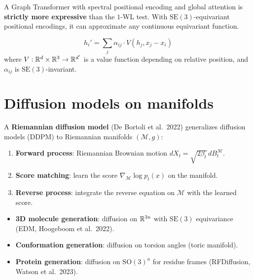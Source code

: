 \begin{theorem}
A Graph Transformer with spectral positional encoding and global
attention is \textbf{strictly more expressive} than the $1$-WL test.
With $\mathrm{SE}(3)$-equivariant positional encodings, it can
approximate any continuous equivariant function.
\end{theorem}

\begin{keyformulas}[title=\textbf{Equivariant attention}]
\[
  h_i' = \sum_{j} \alpha_{ij} \cdot V(h_j, x_j - x_i)
\]
where $V : \mathbb{R}^d \times \mathbb{R}^3 \to \mathbb{R}^{d'}$ is a value function
depending on relative position, and $\alpha_{ij}$ is
$\mathrm{SE}(3)$-invariant.
\end{keyformulas}

\section{Diffusion models on manifolds}
\label{sec:diffusion_manifolds}

\begin{definition}
A \textbf{Riemannian diffusion model} (De Bortoli et al.\ 2022)
generalizes diffusion models (DDPM) to Riemannian manifolds
$(\mathcal{M}, g)$:
\begin{enumerate}
  \item \textbf{Forward process}: Riemannian Brownian motion
        $dX_t = \sqrt{2\beta_t}\, dB_t^{\mathcal{M}}$.
  \item \textbf{Score matching}: learn the score
        $\nabla_{\mathcal{M}} \log p_t(x)$ on the manifold.
  \item \textbf{Reverse process}: integrate the reverse equation
        on $\mathcal{M}$ with the learned score.
\end{enumerate}
\end{definition}

\begin{example}
\begin{itemize}
  \item \textbf{3D molecule generation}: diffusion on $\mathbb{R}^{3n}$
        with $\mathrm{SE}(3)$ equivariance
        (EDM, Hoogeboom et al.\ 2022).
  \item \textbf{Conformation generation}: diffusion on torsion
        angles (toric manifold).
  \item \textbf{Protein generation}: diffusion on
        $\mathrm{SO}(3)^n$ for residue frames
        (RFDiffusion, Watson et al.\ 2023).
\end{itemize}
\end{example}

